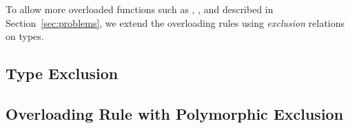 % 
% 
% 
% 

To allow more overloaded functions such as , , and 
described in Section~\ref{sec:problems},
we extend the overloading rules using \emph{exclusion} relations on types.

\subsection{Type Exclusion}\label{sec:excdec}


\subsection{Overloading Rule with Polymorphic Exclusion}\label{sec:exc-polyrules}


